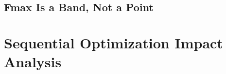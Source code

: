 \subsection{Fmax Is a Band, Not a Point}
\label{sec:fmax-band}

\section{Sequential Optimization Impact Analysis}
\label{sec:opt-impact}

